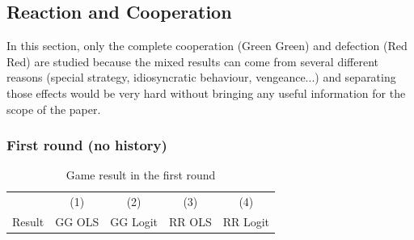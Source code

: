 \documentclass{article} %
\begin{document}
\subsection{Reaction and Cooperation}
In this section, only the complete cooperation (Green Green) and defection (Red Red) are studied because the mixed results can come from several different reasons (special strategy, idiosyncratic behaviour, vengeance...) and separating those effects would be very hard without bringing any useful information for the scope of the paper.
\subsubsection{First round (no history) }

\begin{table}[H]
\caption{Game result in the first round} \label{tab:first_coop}

\begin{center}
\begin{tabular}{lcccc} \hline
 & (1) & (2) & (3) & (4) \\
Result & GG OLS & GG Logit & RR OLS & RR Logit\\ \hline



\end{tabular}
\end{center}
\end{table}
\end{document}

